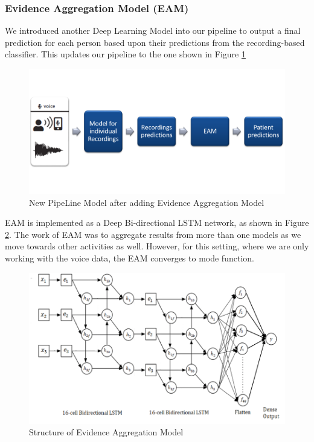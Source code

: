 \subsubsection{Evidence Aggregation Model (EAM)}
We introduced another Deep Learning Model into our pipeline to output a final prediction for each person based upon their predictions from the recording-based classifier. This updates our pipeline to the one shown in Figure \ref{fig:new_pipe}
\begin{figure}[htbp]
  \centering
  \includegraphics[width=\textwidth]{./Figures/new_pipe.png}
  \caption{New PipeLine Model after adding Evidence Aggregation Model}
  \label{fig:new_pipe}
\end{figure}
EAM is implemented as a Deep Bi-directional LSTM network, as shown in Figure \ref{fig:eam}. The work of EAM was to aggregate results from more than one models as we move towards other activities as well. However, for this setting, where we are only working with the voice data, the EAM converges to mode function.
\begin{figure}[htbp]
  \centering
  \includegraphics[width=\textwidth]{./Figures/eam.png}
  \caption{Structure of Evidence Aggregation Model}
  \label{fig:eam}
\end{figure}
